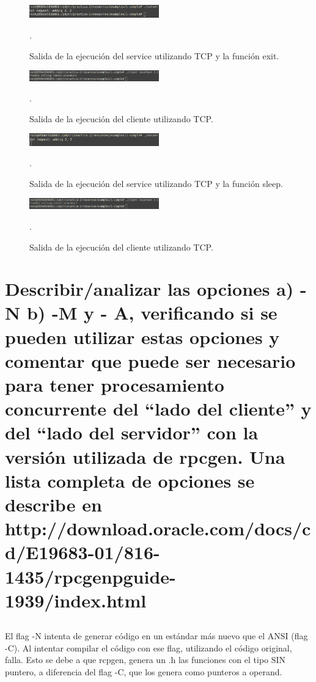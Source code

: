 \documentclass[osajnl,twocolumn,showpacs,superscriptaddress,10pt]{revtex4-1} %
\begin{document}
\begin{figure}[H]
    \centering
    \includegraphics[width=0.5\textwidth]{capturas/1-simple-server-tcp-exit}
    \caption{Salida de la ejecución del service utilizando TCP y la función exit.}.
    \label{figure:1-simple-server-tcp-exit}
\end{figure}

\begin{figure}[H]
    \centering
    \includegraphics[width=0.5\textwidth]{capturas/1-simple-client-tcp-exit}
    \caption{Salida de la ejecución del cliente utilizando TCP.}.
    \label{figure:1-simple-client-tcp-exit}
\end{figure}

\begin{figure}[H]
    \centering
    \includegraphics[width=0.5\textwidth]{capturas/1-simple-server-tcp-sleep}
    \caption{Salida de la ejecución del service utilizando TCP y la función sleep.}.
    \label{figure:1-simple-server-tcp-sleep}
\end{figure}

\begin{figure}[H]
    \centering
    \includegraphics[width=0.5\textwidth]{capturas/1-simple-client-tcp-sleep}
    \caption{Salida de la ejecución del cliente utilizando TCP.}.
    \label{figure:1-simple-client-tcp-sleep}
\end{figure}

\section{Describir/analizar las opciones a) - N b) -M y - A, verificando si se pueden utilizar estas opciones y comentar que puede ser necesario para tener procesamiento concurrente del “lado del cliente” y del “lado del servidor” con la versión
utilizada de rpcgen. Una lista completa de opciones se describe en
http://download.oracle.com/docs/cd/E19683-01/816-1435/rpcgenpguide-1939/index.html}

\subsection{}
El flag -N intenta de generar código en un estándar más nuevo que el ANSI (flag -C).
Al intentar compilar el código con ese flag, utilizando el código original, falla.
Esto se debe a que rcpgen, genera un .h las funciones con el tipo SIN puntero, a diferencia del flag -C, que los genera como punteros a operand.
\end{document}
